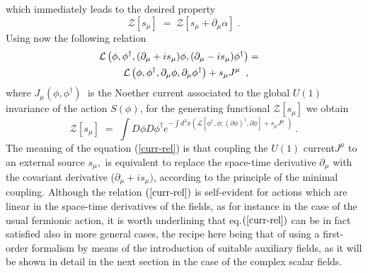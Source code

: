 \documentclass[a4paper,12pt]{article}
\begin{document}
which immediately leads to the desired property
\begin{equation}
  \label{eq:des}
  {\mathcal Z}[s_\mu] \;=\; {\mathcal Z}[s_\mu + \partial_\mu \alpha] \;.
\end{equation}
Using now the following relation
\begin{eqnarray}
{\cal L}\left( \phi ,\phi ^{\dagger },(\partial _\mu  +is_\mu
)\phi ,(\partial _\mu  - is_\mu )\phi ^{\dagger }\right) &=&
\nonumber \\
{\cal L}\left( \phi ,\phi ^{\dagger },\partial _\mu  \phi
,\partial _\mu \phi ^{\dagger }\right) +s_\mu J^\mu \;\;, &&
\label{curr-rel}
\end{eqnarray}
where $J_\mu (\phi ,\phi ^{\dagger })\;$ is the Noether current associated to the
global $U(1)$ invariance of the action $S(\phi )$, for the generating
functional ${\mathcal Z}[s_\mu]$ we obtain
\begin{equation}
  \label{g-f1}
{\mathcal Z}[s_\mu]\;=\; \int D\phi D\phi ^{\dagger }e^{-\int d^3x\left( {\mathcal L}%
[\phi^\dagger,\phi;(\partial\phi)^\dagger,\partial\phi] + s_\mu J^\mu \; \right)} \ .
\end{equation}
The meaning of the equation (\ref{curr-rel}) is that coupling the $U(1)$ current$J^\mu $ to an external source $s_\mu ,$ is equivalent to
replace the space-time derivative $\partial _\mu $ with the covariant derivative ($%
\partial _\mu +is_\mu )$, according to the principle of the minimal coupling.
Although the relation $\left( {\rm {\ref{curr-rel}}}\right) $ is
self-evident for actions which are linear in the space-time
derivatives of the fields, as for instance in the case of the usual
fermionic action, it is worth underlining that eq.$\left( {\rm
    {\ref{curr-rel}}}\right) $ can be in fact satisfied also in more
general cases, the recipe here being that of using a first-order
formalism by means of the introduction of suitable auxiliary fields,
as it will be shown in detail in the next section in the case of the
complex scalar fields.
\end{document}
